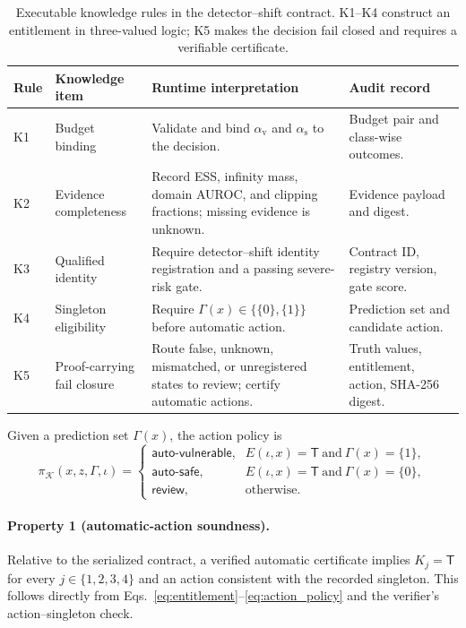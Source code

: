 \documentclass[preprint,12pt]{elsarticle}
\begin{document}
\begin{table}[t]
\centering
\caption{Executable knowledge rules in the detector--shift contract. K1--K4 construct an entitlement in three-valued logic; K5 makes the decision fail closed and requires a verifiable certificate.}
\label{tab:knowledge_rules}
\small
\renewcommand{\arraystretch}{1.12}
\begin{tabularx}{\textwidth}{@{}>{\raggedright\arraybackslash}p{}>{\raggedright\arraybackslash}p{}>{\raggedright\arraybackslash}X>{\raggedright\arraybackslash}p{}@{}}
\toprule
Rule & Knowledge item & Runtime interpretation & Audit record \\
\midrule
K1 & Budget binding & Validate and bind $\alpha_{\mathrm v}$ and $\alpha_{\mathrm s}$ to the decision. & Budget pair and class-wise outcomes. \\
K2 & Evidence completeness & Record ESS, infinity mass, domain AUROC, and clipping fractions; missing evidence is unknown. & Evidence payload and digest. \\
K3 & Qualified identity & Require detector--shift identity registration and a passing severe-risk gate. & Contract ID, registry version, gate score. \\
K4 & Singleton eligibility & Require $\Gamma(x)\in\{\{0\},\{1\}\}$ before automatic action. & Prediction set and candidate action. \\
K5 & Proof-carrying fail closure & Route false, unknown, mismatched, or unregistered states to review; certify automatic actions. & Truth values, entitlement, action, SHA-256 digest. \\
\bottomrule
\end{tabularx}
\end{table}

Given a prediction set $\Gamma(x)$, the action policy is
\begin{equation}
\pi_{\mathcal K}(x,z,\Gamma,\iota)=
\begin{cases}
\textsf{auto-vulnerable}, & E(\iota,x)=\mathsf T\ \text{and}\ \Gamma(x)=\{1\},\\
\textsf{auto-safe}, & E(\iota,x)=\mathsf T\ \text{and}\ \Gamma(x)=\{0\},\\
\textsf{review}, & \text{otherwise}.
\end{cases}
\label{eq:action_policy}
\end{equation}

\paragraph{Property 1 (automatic-action soundness).}
Relative to the serialized contract, a verified automatic certificate implies $K_j=\mathsf T$ for every $j\in\{1,2,3,4\}$ and an action consistent with the recorded singleton. This follows directly from Eqs.~\eqref{eq:entitlement}--\eqref{eq:action_policy} and the verifier's action--singleton check.
\end{document}
